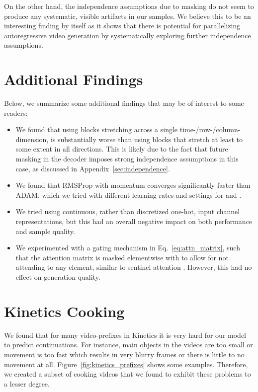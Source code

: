 \documentclass{article} \usepackage{iclr2020_conference,times}
\begin{document}
On the other hand, the independence assumptions due to masking do not seem to produce any systematic, visible artifacts in our samples. We believe this to be an interesting finding by itself as it shows that there is potential for parallelizing autoregressive video generation by systematically exploring further independence assumptions.

\section{Additional Findings} \label{sec:laundry-list}

Below, we summarize some additional findings that may be of interest to some readers:

\begin{itemize}
    \item We found that using blocks stretching across a single time-/row-/column- dimension, is substantially worse than using blocks that stretch at least to some extent in all directions. This is likely due to the fact that future masking in the decoder imposes strong independence assumptions in this case, as discussed in Appendix~\ref{sec:independence}.
    \item We found that RMSProp with momentum converges significantly faster than ADAM, which we tried with different learning rates and settings for  and .
    \item We tried using continuous, rather than discretized one-hot, input channel representations, but this had an overall negative impact on both performance and sample quality.
    \item We experimented with a gating mechanism in Eq.~\ref{eq:attn_matrix}, such that the attention matrix  is masked elementwise with  to allow for not attending to any element, similar to sentinel attention \citep{Lu2017KnowingWT}. However, this had no effect on generation quality.
\end{itemize}

\section{Kinetics Cooking}\label{sec:kinetics_cooking}
We found that for many video-prefixes in Kinetics it is very hard for our model to predict continuations. For instance, main objects in the videos are too small or movement is too fast which results in very blurry frames or there is little to no movement at all. Figure~\ref{fig:kinetics_prefixes} shows some examples.
Therefore, we created a subset of cooking videos that we found to exhibit these problems to a lesser degree.
\end{document}
